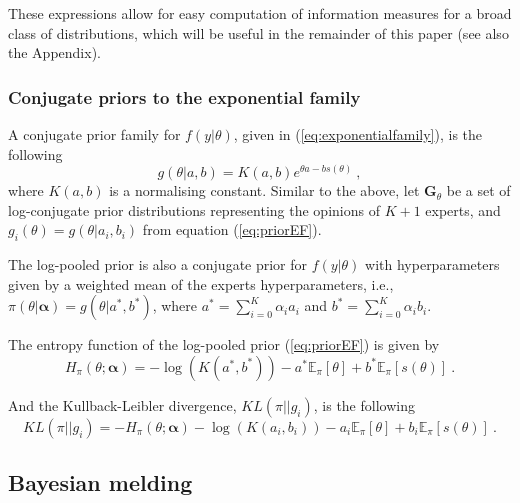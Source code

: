 \documentclass[a4paper, notitlepage, 10pt]{article}
\begin{document}
These expressions allow for easy computation of information measures for a broad class of distributions, which will be useful in the remainder of this paper (see also the Appendix).

\subsubsection{Conjugate priors to the exponential family}
\label{sec:conjugexpofamily}

A conjugate prior family for $f(y|\theta)$, given in (\ref{eq:exponentialfamily}), is the following
\begin{equation}
\label{eq:priorEF}
g(\theta | a, b) = K(a,b) e^{\theta a - b s(\theta)} \: ,
\end{equation}
where $K(a,b)$ is a normalising constant.
Similar to the above, let $\mathbf{G}_{\theta}$ be a set of log-conjugate prior distributions representing the opinions of $K+1$ experts, and $g_i(\theta) = g(\theta | a_i, b_i)$ from equation (\ref{eq:priorEF}).

The log-pooled prior is also a conjugate prior for $f(y|\theta)$ with hyperparameters given by a weighted mean of the experts hyperparameters, i.e., $\pi(\theta|\boldsymbol\alpha) = g(\theta | a^*, b^* )$, where $a^* = \sum_{i=0}^K \alpha_i a_i$ and $b^* = \sum_{i=0}^K \alpha_i b_i$.

The entropy function of the log-pooled prior (\ref{eq:priorEF}) is given by
\begin{equation}
\label{eq:entropypriorEF}
H_\pi(\theta; \boldsymbol\alpha) = - \log (K(a^*, b^*))  -  a^*  \mathbb{E}_\pi[\theta]  +  b^*  \mathbb{E}_\pi[s(\theta)] \: .
\end{equation}

And the Kullback-Leibler divergence, $KL(\pi || g_i )$, is the following
\begin{equation}
\label{eq:KLpriorEF}
KL( \pi || g_i ) = - H_\pi(\theta; \boldsymbol\alpha) - \log( K(a_i,b_i)) - a_i \mathbb{E}_\pi[\theta] + b_i \mathbb{E}_\pi[s(\theta)] \: .
\end{equation}


\subsection{Bayesian melding}
\label{sec:background_melding}
\end{document}
